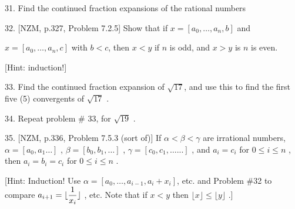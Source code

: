 

\ctln{\centerline}
\ssk{\smallskip}
\msk{\medskip}
\bsk{\bigskip}

\overfullrule=0pt
\nopagenumbers





\msk


\bsk

\item{31.} Find the continued fraction expansions of the rational numbers

\ssk


\bsk

\item{32.} [NZM, p.327, Problem 7.2.5] Show that if $x=[a_0,\ldots,a_n,b]$ and 

\item{}$x=[a_0,\ldots,a_n,c]$ with $b<c$,
then $x<y$ if $n$ is odd, and $x>y$ is $n$ is even. 

\msk

\item{}[Hint: induction!]

\bsk

\item{33.} Find the continued fraction expansion of $\sqrt{17}$, 
and use this to find the first five (5) convergents of $\sqrt{17}$ .

\bsk

\item{34.} Repeat problem \# 33, for $\sqrt{19}$ .

\bsk

\item{35.} [NZM, p.336, Problem 7.5.3 (sort of)] If $\alpha < \beta < \gamma$ are irrational numbers, $\alpha=[a_0,a_1\ldots]$ , 
$\beta=[b_0,b_1,\ldots]$ , 
$\gamma=[c_0,c_1,\ldots...]$ , and $a_i=c_i$ for $0\leq i\leq n$ , then 
$a_i=b_i=c_i$ for $0\leq i\leq n$ .

\msk

\item{} [Hint: Induction! Use $\alpha = [a_0,\ldots ,a_{i-1},a_i+x_i] $, etc. and Problem \#32 to compare 
$\displaystyle a_{i+1}=\lfloor{{1}\over{x_i}}\rfloor$ , etc. 
Note that if $x<y$ then $\lfloor x\rfloor \leq \lfloor y\rfloor$ .]

